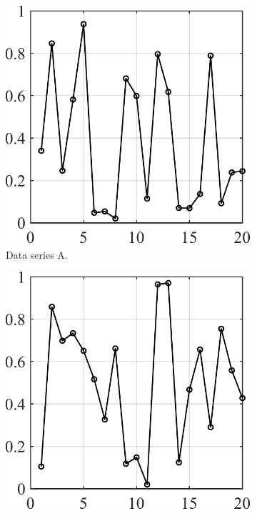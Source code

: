 \documentclass[a4paper]{article}
\begin{document}
\lipsum[1]

\begin{figure}[h!]
\def\CE{0.24}
\centering
\begin{subfigure}[b]{\CE\textwidth}
    \includegraphics[width=\textwidth]{pic-1.pdf}
    \caption{Data series A.}
    \label{fig-a}
\end{subfigure}
\hfill
\begin{subfigure}[b]{\CE\textwidth}
    \includegraphics[width=\textwidth]{pic-2.pdf}

\end{subfigure}
\end{figure}
\end{document}

